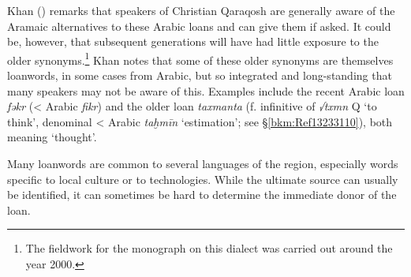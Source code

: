 \documentclass[output=paper]{langsci/langscibook}
\begin{document}
Khan (\citeyear[516]{Khan2002}) remarks that speakers of Christian Qaraqosh are generally aware of the Aramaic alternatives to these Arabic loans and can give them if asked. It could be, however, that subsequent generations will have had little exposure to the older synonyms.\footnote{The fieldwork for the monograph on this dialect was carried out around the year 2000.} Khan notes that some of these older synonyms are themselves {loanwords}, in some cases from Arabic, but so integrated and long-standing that many speakers may not be aware of this. Examples include the recent Arabic loan \textit{fəkr} (< Arabic \textit{fikr}) and the older loan \textit{taxmanta} (f. {infinitive} of  \textit{√txmn} Q ‘to think’, denominal < Arabic \textit{taḫmīn} ‘estimation’; see §\ref{bkm:Ref13233110}), both meaning ‘thought’.

Many {loanwords} are common to several languages of the region, especially words specific to local culture or to technologies. While the ultimate source can usually be identified, it can sometimes be hard to determine the immediate donor of the loan. 
\end{document}
